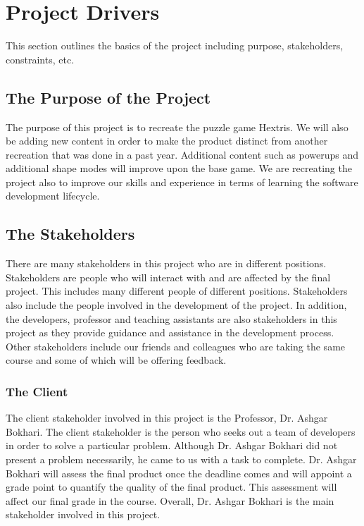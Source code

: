 \documentclass[12pt, titlepage]{article}
\begin{document}
\vspace*{\fill}
\newpage


\section{Project Drivers}
This section outlines the basics of the project including purpose, stakeholders, constraints, etc.

\subsection{The Purpose of the Project}
The purpose of this project is to recreate the puzzle game Hextris. We will also be adding new content in order to make the product distinct from another recreation that was done in a past year. Additional content such as powerups and additional shape modes will improve upon the base game. We are recreating the project also to improve our skills and experience in terms of learning the software development lifecycle.

\subsection{The Stakeholders}
There are many stakeholders in this project who are in different positions. Stakeholders are people who will interact with and are affected by the final project. This includes many different people of different positions. Stakeholders also include the people involved in the development of the project. In addition, the developers, professor and teaching assistants are also stakeholders in this project as they provide guidance and assistance in the development process. Other stakeholders include our friends and colleagues who are taking the same course and some of which will be offering feedback.


\subsubsection{The Client}
The client stakeholder involved in this project is the Professor, Dr. Ashgar Bokhari. The client stakeholder is the person who seeks out a team of developers in order to solve a particular problem. Although Dr. Ashgar Bokhari did not present a problem necessarily, he came to us with a task to complete. Dr. Ashgar Bokhari will assess the final product once the deadline comes and will appoint a grade point to quantify the quality of the final product. This assessment will affect our final grade in the course. Overall, Dr. Ashgar Bokhari is the main stakeholder involved in this project.
\end{document}
